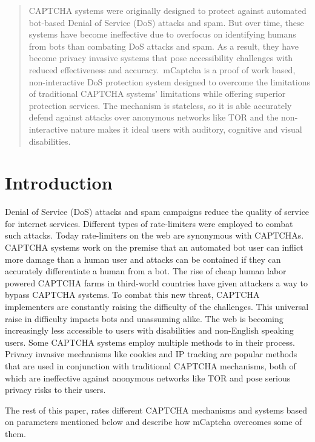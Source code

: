 \begin{abstract}
	CAPTCHA systems were originally designed to protect against automated
	bot-based Denial of Service (DoS) attacks and spam. But over time, these
	systems have become ineffective due to overfocus on identifying humans from
	bots than combating DoS attacks and spam. As a result, they have become
	privacy invasive systems that pose accessibility challenges with reduced
	effectiveness and accuracy.\ mCaptcha is a proof of work based,
	non-interactive DoS protection system designed to overcome the limitations
	of traditional CAPTCHA systems' limitations while offering superior
	protection services. The mechanism is stateless, so it is able accurately
	defend against attacks over anonymous networks like TOR and the
	non-interactive nature makes it ideal users with auditory, cognitive and
	visual disabilities.
\end{abstract}
 
\section{Introduction}\label{sec:intro}
Denial of Service (DoS) attacks and spam campaigns reduce the quality of service
for internet services. Different types of rate-limiters were employed to combat
such attacks. Today rate-limiters on the web are synonymous with CAPTCHAs.
CAPTCHA systems work on the premise that an automated bot user can inflict more
damage than a human user and attacks can be contained if they can accurately
differentiate a human from a bot. The rise of cheap human labor powered CAPTCHA
farms in third-world countries have given attackers a way to bypass CAPTCHA
systems. To combat this new threat, CAPTCHA implementers are constantly raising the
difficulty of the challenges. This universal raise in difficulty impacts bots
and unassuming alike. The web is becoming increasingly less accessible to users
with disabilities and non-English speaking users. Some CAPTCHA systems employ
multiple methods to in their process. Privacy invasive mechanisms like cookies
and IP tracking are popular methods that are used in conjunction with
traditional CAPTCHA mechanisms, both of which are ineffective against
anonymous networks like TOR and pose serious privacy risks to their users.

The rest of this paper, rates different CAPTCHA mechanisms and systems based on
parameters mentioned below and describe how mCaptcha overcomes some of
them. 





